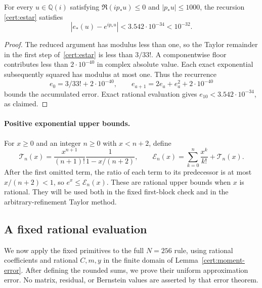 \begin{lemma}\label{cert:rounded-exponential}
For every $u\in\mathbb Q(i)$ satisfying
$\Re(ip_*u)\le0$ and $|p_*u|\le1000$, the recursion
\eqref{cert:estar} satisfies
\[
 |e_*(u)-e^{ip_*u}|<3.542\cdot10^{-34}<10^{-32}.
\]
\end{lemma}

\begin{proof}
The reduced argument has modulus less than one, so the Taylor remainder
in the first step of~\eqref{cert:estar} is less than $3/33!$.
A componentwise floor contributes less than $2\cdot10^{-40}$ in complex
absolute value.  Each exact exponential subsequently squared has modulus
at most one.  Thus the recurrence
\[
 e_0=3/33!+2\cdot10^{-40},\qquad
 e_{a+1}=2e_a+e_a^2+2\cdot10^{-40}
\]
bounds the accumulated error.  Exact rational evaluation gives
$e_{10}<3.542\cdot10^{-34}$, as claimed.
\end{proof}

\paragraph{Positive exponential upper bounds.}
For $x\ge0$ and an integer $n\ge0$ with $x<n+2$, define
\begin{equation}\label{ind:positive-exponential}
 \mathcal T_n(x)=\frac{x^{n+1}}{(n+1)!}\frac1{1-x/(n+2)},\qquad
 \mathcal E_n(x)=\sum_{k=0}^n\frac{x^k}{k!}+\mathcal T_n(x).
\end{equation}
After the first omitted term, the ratio of each term to its predecessor is
at most $x/(n+2)<1$, so $e^x\le\mathcal E_n(x)$.  These are rational
upper bounds when $x$ is rational.  They will be used both in the fixed
first-block check and in the arbitrary-refinement Taylor method.

\subsection{A fixed rational evaluation}\label{cert:rational}

We now apply the fixed primitives to the full $N=256$ rule, using rational
coefficients and rational $C,m,y$ in the finite domain of
Lemma~\ref{cert:moment-error}.  After defining the rounded sums, we prove
their uniform approximation error.  No matrix, residual, or Bernstein
values are asserted by that error theorem.

